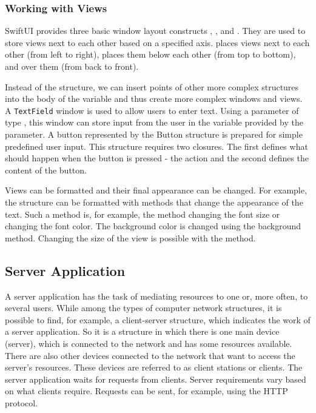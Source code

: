\documentclass[
  biblatex = false,
  language=english,
  figures=false,
  sourcecodes,
  glossaries,
  index
]{kidiplom}
\begin{document}
\subsubsection{Working with Views}
SwiftUI provides three basic window layout constructs , , and . They are used to store views next to each other based on a specified axis.  places views next to each other (from left to right),   places them below each other (from top to bottom), and  over them (from back to front).

Instead of the  structure, we can insert points of other more complex structures into the body of the variable and thus create more complex windows and views. A \texttt{TextField} window is used to allow users to enter text. Using a parameter of type , this window can store input from the user in the variable provided by the parameter. A button represented by the Button structure is prepared for simple predefined user input. This structure requires two closures. The first defines what should happen when the button is pressed - the action and the second defines the content of the button.

Views can be formatted and their final appearance can be changed. For example, the  structure can be formatted with methods that change the appearance of the text. Such a method is, for example, the  method changing the font size or  changing the font color. The background color is changed using the background method. Changing the size of the view is possible with the  method.

\subsection{Server Application}
A server application has the task of mediating resources to one or, more often, to several users. While among the types of computer network structures, it is possible to find, for example, a client-server structure, which indicates the work of a server application. So it is a structure in which there is one main device (server), which is connected to the network and has some resources available. There are also other devices connected to the network that want to access the server's resources. These devices are referred to as client stations or clients. The server application waits for requests from clients. Server requirements vary based on what clients require. Requests can be sent, for example, using the HTTP protocol.
\end{document}
